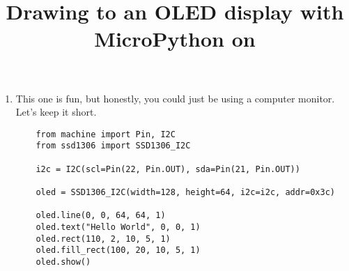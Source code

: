 \documentclass{../tutorial}
\title{Drawing to an OLED display with MicroPython on \abbr{ESP32}}
\begin{document}
\begin{enumerate}

\item
    This one is fun, but honestly, you could just be using a computer monitor.
    Let's keep it short.

    \begin{lstlisting}
    from machine import Pin, I2C
    from ssd1306 import SSD1306_I2C

    i2c = I2C(scl=Pin(22, Pin.OUT), sda=Pin(21, Pin.OUT))

    oled = SSD1306_I2C(width=128, height=64, i2c=i2c, addr=0x3c)

    oled.line(0, 0, 64, 64, 1)
    oled.text("Hello World", 0, 0, 1)
    oled.rect(110, 2, 10, 5, 1)
    oled.fill_rect(100, 20, 10, 5, 1)
    oled.show()
    \end{lstlisting}

\end{enumerate}
\end{document}
